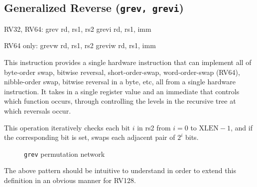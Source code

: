 \subsection{Generalized Reverse (\texttt{grev,\ grevi})}
\label{grev}

\begin{rvb}
  RV32, RV64:
    grev rd, rs1, rs2
    grevi rd, rs1, imm

  RV64 only:
    grevw rd, rs1, rs2
    greviw rd, rs1, imm
\end{rvb}

This instruction provides a single hardware instruction that can implement all
of byte-order swap, bitwise reversal, short-order-swap, word-order-swap
(RV64), nibble-order swap, bitwise reversal in a byte, etc, all from a single
hardware instruction. It takes in a single register value and an immediate that
controls which function occurs, through controlling the levels in the recursive
tree at which reversals occur.

This operation iteratively checks each bit $i$ in rs2 from $i=0$ to
$\textrm{XLEN}-1$, and if the corresponding bit is set, swaps each adjacent
pair of $2^i$ bits.

\begin{figure}[t]
\begin{center}

\end{center}
\caption{\texttt{grev} permutation network}
\label{permnet-grev}
\end{figure}



The above pattern should be intuitive to understand in order to extend
this definition in an obvious manner for RV128.

